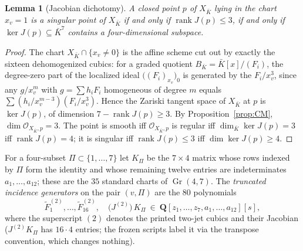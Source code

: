 \documentclass[11pt]{article}
\newtheorem{lemma}[theorem]{Lemma}
\theoremstyle{definition}
\theoremstyle{remark}
\newcommand{\QQ}{\mathbf Q}
\newcommand{\rank}{\operatorname{rank}}
\newcommand{\Gr}{\operatorname{Gr}}
\begin{document}
\begin{lemma}[Jacobian dichotomy]\label{lem:jacobian}
A closed point $p$ of $X_{\bar K}$ lying in the chart $x_v=1$ is a singular
point of $X_{\bar K}$ if and only if
$\rank J(p)\leq3$, if and only if $\ker J(p)\subseteq\bar K^7$ contains a
four-dimensional subspace.
\end{lemma}

\begin{proof}
The chart $X_{\bar K}\cap\{x_v\neq0\}$ is the affine scheme cut out by
exactly the sixteen dehomogenized cubics: for a graded quotient
$B_{\bar K}=\bar K[x]/(F_i)$, the degree-zero part of the localized ideal
$\bigl((F_i)_{x_v}\bigr)_0$ is generated by the $F_i/x_v^3$, since any
$g/x_v^m$ with $g=\sum h_iF_i$ homogeneous of degree $m$ equals
$\sum(h_i/x_v^{m-3})(F_i/x_v^3)$.  Hence the Zariski tangent space of
$X_{\bar K}$ at $p$ is $\ker J(p)$, of dimension $7-\rank J(p)\geq3$.  By
Proposition~\ref{prop:CM}, $\dim\mathcal O_{X_{\bar K},p}=3$.  The point is
smooth iff $\mathcal O_{X_{\bar K},p}$ is regular iff
$\dim_{\bar K}\ker J(p)=3$ iff $\rank J(p)=4$; it is singular iff
$\rank J(p)\leq3$ iff $\dim\ker J(p)\geq4$.
\end{proof}

For a four-subset $\Pi\subset\{1,\ldots,7\}$ let $K_\Pi$ be the
$7\times4$ matrix whose rows indexed by $\Pi$ form the identity and whose
remaining twelve entries are indeterminates $a_1,\ldots,a_{12}$; these are
the $35$ standard charts of $\Gr(4,7)$.  The \emph{truncated incidence
generators} on the pair $(v,\Pi)$ are the $80$ polynomials
\[
 \widetilde F^{(2)}_1,\ldots,\widetilde F^{(2)}_{16},\quad
 \bigl(J^{(2)}\bigr)\,K_\Pi
 \ \in\ \QQ[z_1,\ldots,z_7,a_1,\ldots,a_{12}][s],
\tag{8.1}\label{eq:incgens}
\]
where the superscript $(2)$ denotes the printed two-jet cubics and their
Jacobian ($J^{(2)}K_\Pi$ has $16\cdot4$ entries; the frozen scripts label
it via the transpose convention, which changes nothing).
\end{document}
